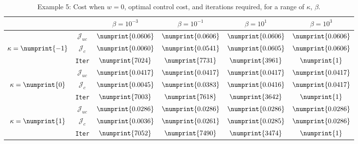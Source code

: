 \begin{table}
\begin{tabular}{ | c | c || c | c | c | c ||}
\hline
\multicolumn{2}{|c||}{}& $\beta = 10^{-3}$ & $\beta = 10^{-1}$ & $\beta = 10^{1}$ & $\beta = 10^{3}$  \\
\hline
\hline
 & $\mathcal{J}_{uc}$ & $\numprint{0.0606}$ & $\numprint{0.0606}$ & $\numprint{0.0606}$ & $\numprint{0.0606}$ \\
$\kappa= \numprint{-1}$  & $\mathcal{J}_c$ & $\numprint{0.0060}$ & $\numprint{0.0541}$ & $\numprint{0.0605}$ & $\numprint{0.0606}$ \\
& \texttt{Iter} & $\numprint{7024}$ & $\numprint{7731}$ & $\numprint{3961}$ & $\numprint{1}$ \\
\hline
 & $\mathcal{J}_{uc}$ & $\numprint{0.0417}$ & $\numprint{0.0417}$ & $\numprint{0.0417}$ & $\numprint{0.0417}$ \\
$\kappa= \numprint{0}$  & $\mathcal{J}_c$ & $\numprint{0.0045}$ & $\numprint{0.0383}$ & $\numprint{0.0416}$ & $\numprint{0.0417}$ \\
& \texttt{Iter} & $\numprint{7003}$ & $\numprint{7618}$ & $\numprint{3642}$ & $\numprint{1}$ \\
\hline
 & $\mathcal{J}_{uc}$ & $\numprint{0.0286}$ & $\numprint{0.0286}$ & $\numprint{0.0286}$ & $\numprint{0.0286}$ \\
$\kappa= \numprint{1}$  & $\mathcal{J}_c$ & $\numprint{0.0036}$ & $\numprint{0.0261}$ & $\numprint{0.0285}$ & $\numprint{0.0286}$ \\
& \texttt{Iter} & $\numprint{7052}$ & $\numprint{7490}$ & $\numprint{3474}$ & $\numprint{1}$ \\
\hline
\end{tabular}
\caption{Example 5: Cost when $w=0$, optimal control cost, and iterations required, for a range of $\kappa$, $\beta$.}
\label{TabS5:Prob5}
\end{table}